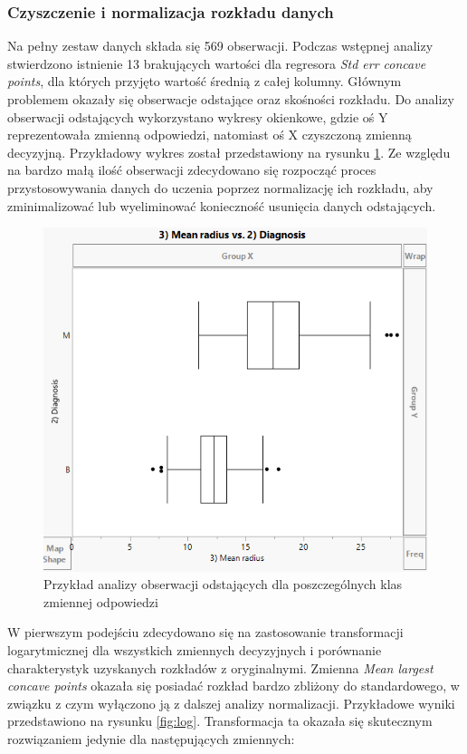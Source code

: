 	
	\subsubsection{Czyszczenie i normalizacja rozkładu danych}
	
	Na pełny zestaw danych składa się 569 obserwacji. Podczas wstępnej analizy stwierdzono istnienie 13 brakujących wartości dla regresora \textit{Std err concave points}, dla których przyjęto wartość średnią z całej kolumny. Głównym problemem okazały się obserwacje odstające oraz skośności rozkładu. Do analizy obserwacji odstających wykorzystano wykresy okienkowe, gdzie oś Y reprezentowała zmienną odpowiedzi, natomiast oś X czyszczoną zmienną decyzyjną. Przykładowy wykres został przedstawiony na rysunku \ref{fig:boxgraph}. Ze względu na bardzo małą ilość obserwacji zdecydowano się rozpocząć proces przystosowywania danych do uczenia poprzez normalizację ich rozkładu, aby zminimalizować lub wyeliminować konieczność usunięcia danych odstających. 
	
	\begin{figure}[!ht]
		\centering
		\includegraphics[width=0.7\linewidth]{Rysunki/Rozdzial2/box_graph}
		\caption{Przykład analizy obserwacji odstających dla poszczególnych klas zmiennej odpowiedzi}
		\label{fig:boxgraph}
	\end{figure}

	\newpage
	
	W pierwszym podejściu zdecydowano się na zastosowanie transformacji logarytmicznej dla wszystkich zmiennych decyzyjnych i porównanie charakterystyk uzyskanych rozkładów z oryginalnymi. Zmienna \textit{Mean largest concave points} okazała się posiadać rozkład bardzo zbliżony do standardowego, w związku z czym wyłączono ją z dalszej analizy normalizacji. Przykładowe wyniki przedstawiono na rysunku \ref{fig:log}. Transformacja ta okazała się skutecznym rozwiązaniem jedynie dla następujących zmiennych:
	
